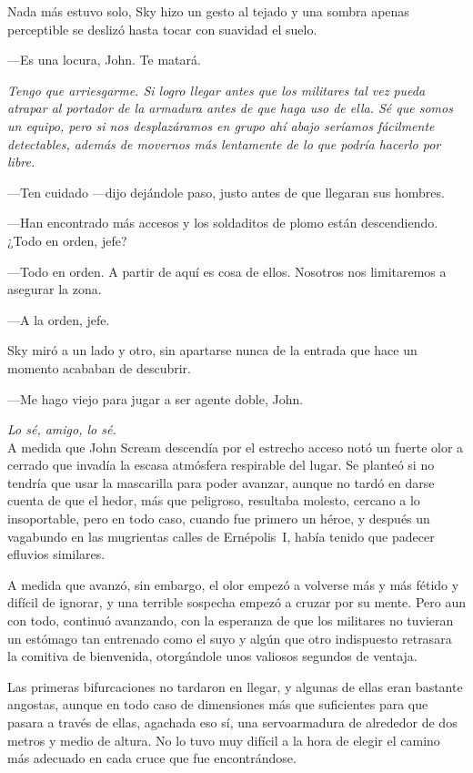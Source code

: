Nada más estuvo solo, Sky hizo un gesto al tejado y una sombra apenas perceptible se deslizó hasta tocar con suavidad el suelo.

---Es una locura, John. Te matará.

\emph{Tengo que arriesgarme. Si logro llegar antes que los militares tal vez pueda atrapar al portador de la armadura antes de que haga uso de ella. Sé que somos un equipo, pero si nos desplazáramos en grupo ahí abajo seríamos fácilmente detectables, además de movernos más lentamente de lo que podría hacerlo por libre.}

---Ten cuidado ---dijo dejándole paso, justo antes de que llegaran sus hombres.

---Han encontrado más accesos y los soldaditos de plomo están descendiendo. ¿Todo en orden, jefe?

---Todo en orden. A partir de aquí es cosa de ellos. Nosotros nos limitaremos a asegurar la zona.

---A la orden, jefe.

Sky miró a un lado y otro, sin apartarse nunca de la entrada que hace un momento acababan de descubrir.

---Me hago viejo para jugar a ser agente doble, John.

\emph{Lo sé, amigo, lo sé.}\\

\noindent{}A medida que John Scream descendía por el estrecho acceso notó un fuerte olor a cerrado que invadía la escasa atmósfera respirable del lugar. Se planteó si no tendría que usar la mascarilla para poder avanzar, aunque no tardó en darse cuenta de que el hedor, más que peligroso, resultaba molesto, cercano a lo insoportable, pero en todo caso, cuando fue primero un héroe, y después un vagabundo en las mugrientas calles de Ernépolis~I, había tenido que padecer efluvios similares.

A medida que avanzó, sin embargo, el olor empezó a volverse más y más fétido y difícil de ignorar, y una terrible sospecha empezó a cruzar por su mente. Pero aun con todo, continuó avanzando, con la esperanza de que los militares no tuvieran un estómago tan entrenado como el suyo y algún que otro indispuesto retrasara la comitiva de bienvenida, otorgándole unos valiosos segundos de ventaja.

Las primeras bifurcaciones no tardaron en llegar, y algunas de ellas eran bastante angostas, aunque en todo caso de dimensiones más que suficientes para que pasara a través de ellas, agachada eso sí, una servoarmadura de alrededor de dos metros y medio de altura. No lo tuvo muy difícil a la hora de elegir el camino más adecuado en cada cruce que fue encontrándose.

